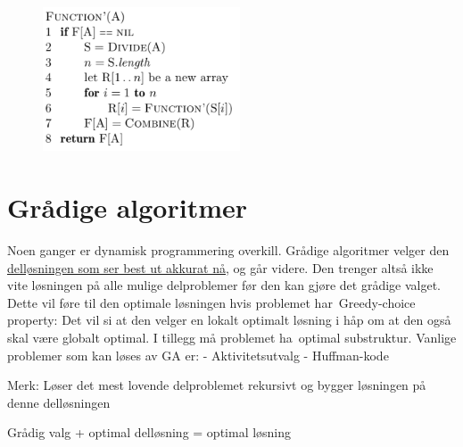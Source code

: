 \documentclass[12pt]{report}
\begin{document}

\begin{figure}[H]
	\begin{Center}
		\includegraphics[width=2.3in,height=1.68in]{./media/image59.png}
	\end{Center}
\end{figure}



\par




\newpage

\vspace{\baselineskip}\setlength{\parskip}{15.0pt}
\section*{Grådige algoritmer}
\setlength{\parskip}{0.0pt}
Noen ganger er dynamisk programmering overkill. Grådige algoritmer velger den \uline{delløsningen som ser best ut akkurat nå}, og går videre. Den trenger altså ikke vite løsningen på alle mulige delproblemer før den kan gjøre det grådige valget. Dette vil føre til den optimale løsningen hvis problemet har Greedy-choice property: Det vil si at den velger en lokalt optimalt løsning i håp om at den også skal være globalt optimal. I tillegg må problemet ha optimal substruktur. Vanlige problemer som kan løses av GA er: - Aktivitetsutvalg - Huffman-kode\par

	\item Merk: Løser det mest lovende delproblemet rekursivt og bygger løsningen på denne delløsningen\par

	\item Grådig valg + optimal delløsning = optimal løsning\par
\end{document}
